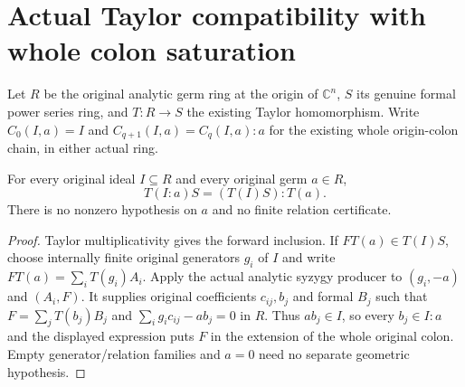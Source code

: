 \section{Actual Taylor compatibility with whole colon saturation}

Let $R$ be the original analytic germ ring at the origin of $\mathbb C^n$,
$S$ its genuine formal power series ring, and $T:R\to S$ the existing Taylor
homomorphism. Write $C_0(I,a)=I$ and $C_{q+1}(I,a)=C_q(I,a):a$ for the
existing whole origin-colon chain, in either actual ring.

\begin{theorem}
\label{hir:actual-formal-extension-whole-principal-colon}
\leanok
For every original ideal $I\subseteq R$ and every original germ $a\in R$,
\[
 T(I:a)S=(T(I)S):T(a).
\]
There is no nonzero hypothesis on $a$ and no finite relation certificate.
\end{theorem}
\begin{proof}
Taylor multiplicativity gives the forward inclusion. If $FT(a)\in T(I)S$,
choose internally finite original generators $g_i$ of $I$ and write
$FT(a)=\sum_iT(g_i)A_i$. Apply the actual analytic syzygy producer to
$(g_i,-a)$ and $(A_i,F)$. It supplies original coefficients $c_{ij},b_j$
and formal $B_j$ such that
$F=\sum_j T(b_j)B_j$ and $\sum_i g_ic_{ij}-ab_j=0$ in $R$.
Thus $ab_j\in I$, so every $b_j\in I:a$ and the displayed expression puts
$F$ in the extension of the whole original colon. Empty generator/relation
families and $a=0$ need no separate geometric hypothesis.
\end{proof}

